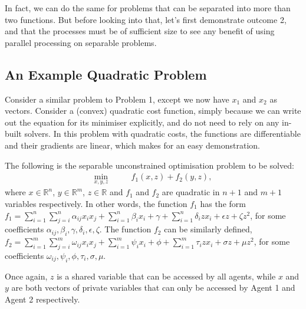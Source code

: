 \documentclass[12pt]{article}
\begin{document}
In fact, we can do the same for problems that can be separated into more than two functions. But before looking into that, let's first demonstrate outcome 2, and that the processes must be of sufficient size to see any benefit of using parallel processing on separable problems.

\subsection*{An Example Quadratic Problem}

Consider a similar problem to Problem 1, except we now have $x_1$ and $x_2$ as vectors. Consider a (convex) quadratic cost function, simply because we can write out the equation for its minimiser explicitly, and do not need to rely on any in-built solvers. In this problem with quadratic costs, the functions are differentiable and their gradients are linear, which makes for an easy demonstration.

The following is the separable unconstrained optimisation problem to be solved:
\begin{align*}
\min_{x,y,z}\qquad& f_1(x,z)+f_2(y,z),
\end{align*}
where $x\in\mathbb{R}^n$, $y\in\mathbb{R}^m$, $z\in\mathbb{R}$ and $f_1$ and $f_2$ are quadratic in $n+1$ and $m+1$ variables respectively. In other words, the function $f_1$ has the form $f_1=\sum\limits_{i=1}^n \sum\limits_{j=i}^n \alpha_{ij}x_ix_j + \sum\limits_{i=1}^n \beta_ix_i+\gamma+\sum\limits_{i=1}^n \delta_izx_i+\epsilon z+\zeta z^2$, for some coefficients $\alpha_{ij},\beta_i,\gamma,\delta_i,\epsilon,\zeta$. The function $f_2$ can be similarly defined, $f_2=\sum\limits_{i=1}^m \sum\limits_{j=i}^m \omega_{ij}x_ix_j + \sum\limits_{i=1}^m \psi_ix_i+\phi+\sum\limits_{i=1}^m \tau_izx_i+\sigma z+\mu z^2$, for some coefficients $\omega_{ij},\psi_i,\phi,\tau_i,\sigma,\mu$.

Once again, $z$ is a shared variable that can be accessed by all agents, while $x$ and $y$ are both vectors of private variables that can only be accessed by Agent 1 and Agent 2 respectively.
\end{document}
